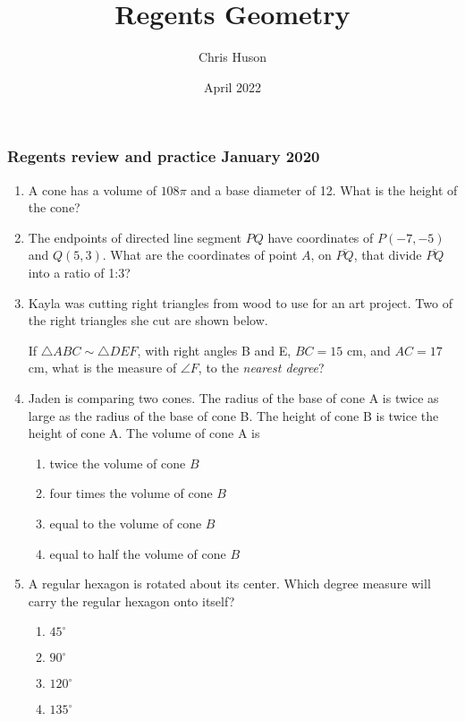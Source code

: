 \documentclass[12pt, twoside]{article}
\title{Regents Geometry}
\author{Chris Huson}
\date{April 2022}
\begin{document}
\subsubsection*{Regents review and practice \hfill January 2020}
\begin{enumerate}[itemsep=0.5cm]
\item A cone has a volume of $108\pi$ and a base diameter of 12. What is the
height of the cone?

\item The endpoints of directed line segment $PQ$ have coordinates of
$P(-7,-5)$ and $Q(5,3)$. What are the coordinates of point $A$, on $\overline{PQ}$,
that divide $\overline{PQ}$ into a ratio of 1:3?

\item Kayla was cutting right triangles from wood to use for an art project.
Two of the right triangles she cut are shown below.
  \begin{center}
  \end{center}
If $\triangle ABC \sim \triangle DEF$, with right angles B and E, $BC=15$ cm, and
$AC=17$ cm, what is the measure of $\angle F$, to the \emph{nearest degree}?

\item Jaden is comparing two cones. The radius of the base of cone A is
twice as large as the radius of the base of cone B. The height of cone
B is twice the height of cone A. The volume of cone A is
\begin{enumerate}
  \item twice the volume of cone $B$
  \item four times the volume of cone $B$
  \item equal to the volume of cone $B$
  \item equal to half the volume of cone $B$
\end{enumerate}

\item A regular hexagon is rotated about its center. Which degree measure
will carry the regular hexagon onto itself? 
\begin{multicols}{2}
  \begin{enumerate}
    \item $45^\circ$
    \item $90^\circ$
    \item $120^\circ$
    \item $135^\circ$
  \end{enumerate}
\end{multicols}


\end{enumerate}
\end{document}
